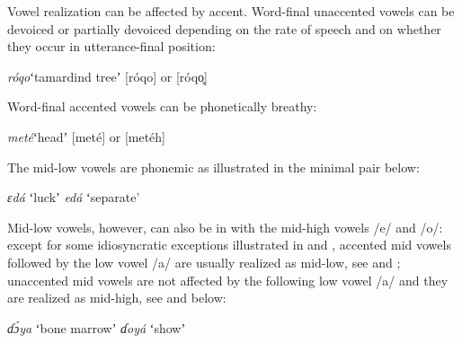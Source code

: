 \documentclass[output=paper]{LSP/langsci}
\begin{document}
Vowel realization can be affected by accent. Word-final unaccented vowels can be devoiced or partially devoiced depending on the rate of speech and on whether they occur in utterance-final position:

\begin{exe}
	\ex \textit{róqo}\hspace{21mm}ʻtamardind treeʼ\hspace{6mm} [róqo] or [róqo̥] 
\end{exe}
Word-final accented vowels can be phonetically breathy:

\begin{exe}
	\ex \textit{meté}\hspace{21mm}ʻheadʼ\hspace{21mm} [meté] or [meté\super h]
\end{exe}
The mid-low vowels are phonemic as illustrated in the minimal pair below:

\begin{exe}
 \ex \begin{xlist}
	\ex \textit{ɛdá}\hspace{13mm} ʻluckʼ 	\label{ex:Petrollino:ɛdá1}	  		  
    \ex \textit{edá}\hspace{13mm} ʻseparate' \label{ex:Petrollino:edá}
\end{xlist}
\end{exe}
Mid-low vowels, however, can also be in  with the mid-high vowels /e/ and /o/: except for some idiosyncratic exceptions illustrated in  and , accented mid vowels followed by the low vowel /a/ are usually realized as mid-low, see  and ; unaccented mid vowels are not affected by the following low vowel /a/ and they are realized as mid-high, see  and  below:

\begin{exe}
	\ex \begin{xlist}
	\ex \textit{ɗɔ́ya}\hspace{10mm} ʻbone marrowʼ \label{ex:Petrollino:bone marrow}
    \ex \textit{ɗoyá}\hspace{10mm} ʻshowʼ \label{ex:Petrollino:show}
    \end{xlist}
\end{exe}
\end{document}
